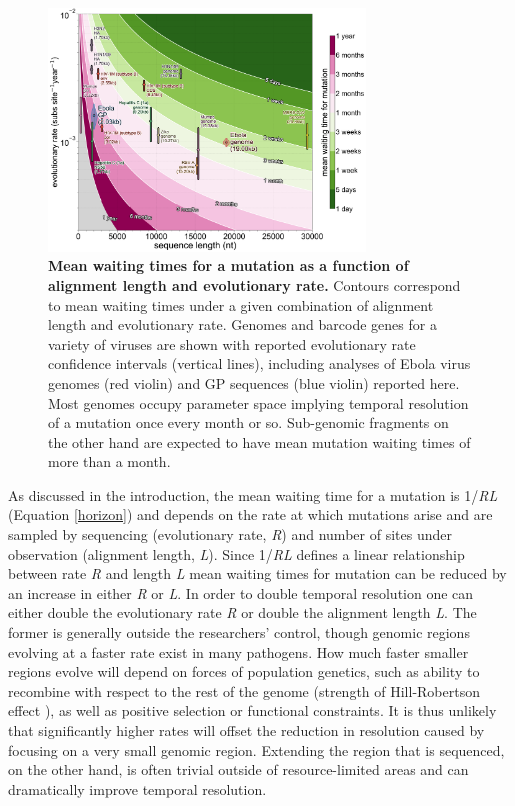 \documentclass[11pt,oneside,letterpaper]{article}
\begin{document}
\begin{figure}[h]
 \centering
	\includegraphics[width=0.75\textwidth]{figures/fig5_contours.png}
	\caption{\textbf{Mean waiting times for a mutation as a function of alignment length and evolutionary rate.}
  Contours correspond to mean waiting times under a given combination of alignment length and evolutionary rate.
  Genomes and barcode genes for a variety of viruses are shown with reported evolutionary rate confidence intervals (vertical lines), including analyses of Ebola virus genomes (red violin) and GP sequences (blue violin) reported here.
  Most genomes occupy parameter space implying temporal resolution of a mutation once every month or so.
  Sub-genomic fragments on the other hand are expected to have mean mutation waiting times of more than a month.
	}
	\label{contours}
\end{figure}

As discussed in the introduction, the mean waiting time for a mutation is 1/\textit{RL} (Equation \ref{horizon}) and depends on the rate at which mutations arise and are sampled by sequencing (evolutionary rate, \textit{R}) and number of sites under observation (alignment length, \textit{L}).
Since 1/\textit{RL} defines a linear relationship between rate \textit{R} and length \textit{L} mean waiting times for mutation can be reduced by an increase in either \textit{R} or \textit{L}.
In order to double temporal resolution one can either double the evolutionary rate \textit{R} or double the alignment length \textit{L}.
The former is generally outside the researchers' control, though genomic regions evolving at a faster rate exist in many pathogens.
How much faster smaller regions evolve will depend on forces of population genetics, such as ability to recombine with respect to the rest of the genome (strength of Hill-Robertson effect \citep{hill_effect_1966}), as well as positive selection or functional constraints.
It is thus unlikely that significantly higher rates will offset the reduction in resolution caused by focusing on a very small genomic region.
Extending the region that is sequenced, on the other hand, is often trivial outside of resource-limited areas and can dramatically improve temporal resolution.
\end{document}
